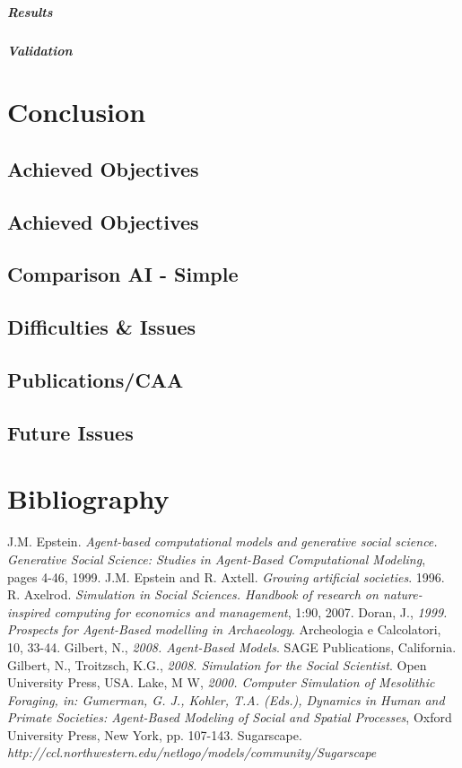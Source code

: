 \documentclass{report}
\begin{document}
			\paragraph{Results}
			\paragraph{Validation}
	

\newpage 
\chapter{Conclusion}
      \section{Achieved Objectives}
      \section{Achieved Objectives}
      \section{Comparison AI - Simple}
      \section{Difficulties \& Issues}
      \section{Publications/CAA}
      \section{Future Issues}
\newpage 
\chapter{Bibliography}
\begin{thebibliography}{9}
\bibitem{[1]} 
J.M. Epstein. 
\emph{Agent-based computational models and generative social science. Generative Social
Science: Studies in Agent-Based Computational Modeling}, pages 4-46, 1999.
\bibitem{[2]} 
J.M. Epstein and R. Axtell.
\emph{Growing artiﬁcial societies}. 1996.
\bibitem{[3]} 
R. Axelrod. 
\emph{Simulation in Social Sciences. Handbook of research on nature-inspired computing for economics and management}, 1:90, 2007.
\bibitem{[4]}
Doran, J., 
\emph{1999. Prospects for Agent-Based modelling in Archaeology}. Archeologia e Calcolatori, 10, 33-44.
\bibitem{[5]}
Gilbert, N.,
\emph{2008. Agent-Based Models}. SAGE Publications, California.
\bibitem{[6]}
Gilbert, N., Troitzsch, K.G.,
\emph{2008. Simulation for the Social Scientist}. Open University Press, USA.
\bibitem{[7]}
Lake, M W,
\emph{2000. Computer Simulation of Mesolithic Foraging, in: Gumerman, G. J., Kohler, T.A. (Eds.), Dynamics in Human and Primate Societies: Agent-Based Modeling of Social and Spatial Processes}, Oxford University Press, New York, pp. 107-143.
\bibitem{[8]}
Sugarscape.
\emph{http://ccl.northwestern.edu/netlogo/models/community/Sugarscape}
\end{thebibliography}
\end{document}
